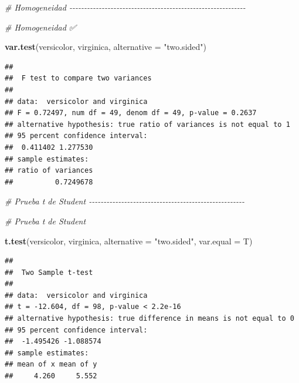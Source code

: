 \documentclass[
]{article}
\newenvironment{Shaded}{\begin{snugshade}}{\end{snugshade}}
\newcommand{\AttributeTok}[1]{\textcolor[rgb]{0.13,0.29,0.53}{#1}}
\newcommand{\CommentTok}[1]{\textcolor[rgb]{0.56,0.35,0.01}{\textit{#1}}}
\newcommand{\FunctionTok}[1]{\textcolor[rgb]{0.13,0.29,0.53}{\textbf{#1}}}
\newcommand{\NormalTok}[1]{#1}
\newcommand{\StringTok}[1]{\textcolor[rgb]{0.31,0.60,0.02}{#1}}
\begin{document}
\begin{Shaded}
\begin{Highlighting}[]
\CommentTok{\# Homogeneidad {-}{-}{-}{-}{-}{-}{-}{-}{-}{-}{-}{-}{-}{-}{-}{-}{-}{-}{-}{-}{-}{-}{-}{-}{-}{-}{-}{-}{-}{-}{-}{-}{-}{-}{-}{-}{-}{-}{-}{-}{-}{-}{-}{-}{-}{-}{-}{-}{-}{-}{-}{-}{-}{-}{-}{-}{-}{-}{-}{-}}

\CommentTok{\# Homogeneidad ✅}

\FunctionTok{var.test}\NormalTok{(versicolor, virginica, }\AttributeTok{alternative =} \StringTok{"two.sided"}\NormalTok{)}
\end{Highlighting}
\end{Shaded}

\begin{verbatim}
## 
##  F test to compare two variances
## 
## data:  versicolor and virginica
## F = 0.72497, num df = 49, denom df = 49, p-value = 0.2637
## alternative hypothesis: true ratio of variances is not equal to 1
## 95 percent confidence interval:
##  0.411402 1.277530
## sample estimates:
## ratio of variances 
##          0.7249678
\end{verbatim}

\begin{Shaded}
\begin{Highlighting}[]
\CommentTok{\# Prueba t de Student {-}{-}{-}{-}{-}{-}{-}{-}{-}{-}{-}{-}{-}{-}{-}{-}{-}{-}{-}{-}{-}{-}{-}{-}{-}{-}{-}{-}{-}{-}{-}{-}{-}{-}{-}{-}{-}{-}{-}{-}{-}{-}{-}{-}{-}{-}{-}{-}{-}{-}{-}{-}{-}}

\CommentTok{\# Prueba t de Student}

\FunctionTok{t.test}\NormalTok{(versicolor, virginica,}
       \AttributeTok{alternative =} \StringTok{"two.sided"}\NormalTok{,}
       \AttributeTok{var.equal =}\NormalTok{ T)}
\end{Highlighting}
\end{Shaded}

\begin{verbatim}
## 
##  Two Sample t-test
## 
## data:  versicolor and virginica
## t = -12.604, df = 98, p-value < 2.2e-16
## alternative hypothesis: true difference in means is not equal to 0
## 95 percent confidence interval:
##  -1.495426 -1.088574
## sample estimates:
## mean of x mean of y 
##     4.260     5.552
\end{verbatim}
\end{document}
